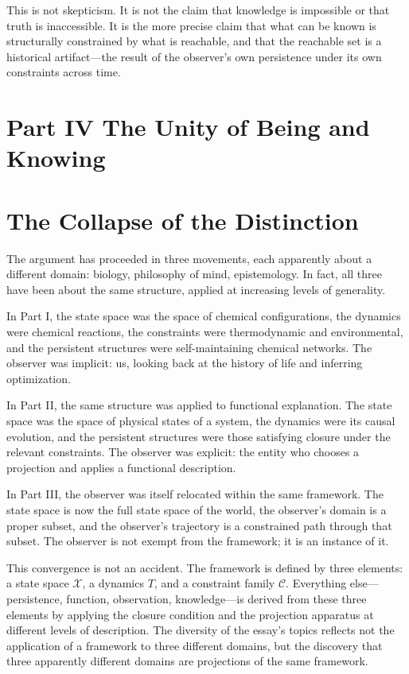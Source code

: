 \documentclass[12pt, a4paper, oneside]{article}
\theoremstyle{plain}
\theoremstyle{definition}
\theoremstyle{remark}
\newcommand{\X}{\mathcal{X}}
\newcommand{\C}{\mathcal{C}}
\newcommand{\T}{T}
\begin{document}
This is not skepticism. It is not the claim that knowledge is impossible or that truth is inaccessible. It is the more precise claim that what can be known is structurally constrained by what is reachable, and that the reachable set is a historical artifact---the result of the observer's own persistence under its own constraints across time.

\section*{Part IV \quad The Unity of Being and Knowing}

\setcounter{section}{13}

\section{The Collapse of the Distinction}

The argument has proceeded in three movements, each apparently about a different domain: biology, philosophy of mind, epistemology. In fact, all three have been about the same structure, applied at increasing levels of generality.

In Part I, the state space was the space of chemical configurations, the dynamics were chemical reactions, the constraints were thermodynamic and environmental, and the persistent structures were self-maintaining chemical networks. The observer was implicit: us, looking back at the history of life and inferring optimization.

In Part II, the same structure was applied to functional explanation. The state space was the space of physical states of a system, the dynamics were its causal evolution, and the persistent structures were those satisfying closure under the relevant constraints. The observer was explicit: the entity who chooses a projection and applies a functional description.

In Part III, the observer was itself relocated within the same framework. The state space is now the full state space of the world, the observer's domain is a proper subset, and the observer's trajectory is a constrained path through that subset. The observer is not exempt from the framework; it is an instance of it.

This convergence is not an accident. The framework is defined by three elements: a state space $\X$, a dynamics $\T$, and a constraint family $\C$. Everything else---persistence, function, observation, knowledge---is derived from these three elements by applying the closure condition and the projection apparatus at different levels of description. The diversity of the essay's topics reflects not the application of a framework to three different domains, but the discovery that three apparently different domains are projections of the same framework.
\end{document}
